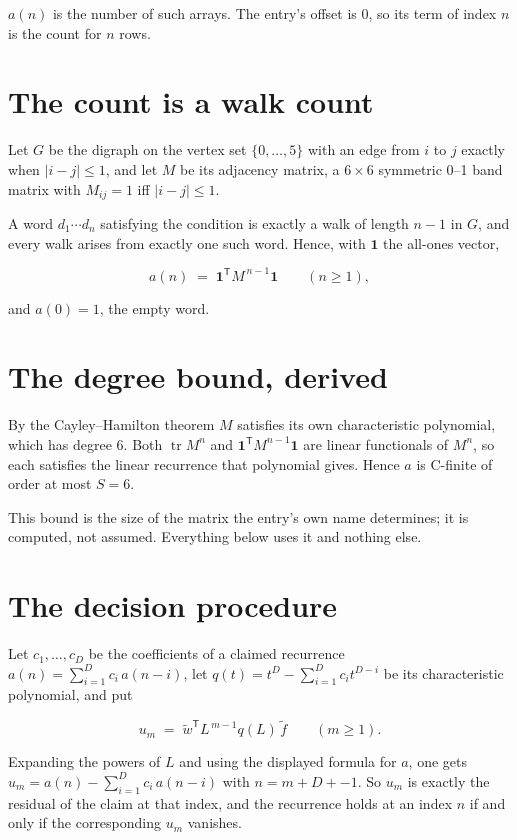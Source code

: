 \documentclass[11pt]{article}
\theoremstyle{definition}
\begin{document}
$a(n)$ is the number of such arrays. The entry's offset is 0, so its term of index $n$ is the count for $n$ rows.

\section{The count is a walk count}

Let $G$ be the digraph on the vertex set $\{0,\dots,5\}$ with an edge from $i$ to $j$ exactly when $|i-j| \le 1$, and let $M$ be its adjacency matrix, a $6 \times 6$ symmetric 0--1 band matrix with $M_{ij} = 1$ iff $|i-j| \le 1$.

A word $d_1\cdots d_n$ satisfying the condition is exactly a walk of length $n-1$ in $G$, and every walk arises from exactly one such word. Hence, with $\mathbf 1$ the all-ones vector,

\[a(n) \;=\; \mathbf 1^{\mathsf T} M^{\,n-1} \mathbf 1 \qquad (n \ge 1),\]

and $a(0) = 1$, the empty word.

\section{The degree bound, derived}

By the Cayley--Hamilton theorem $M$ satisfies its own characteristic polynomial, which has degree $6$. Both $\operatorname{tr} M^n$ and $\mathbf 1^{\mathsf T} M^{n-1} \mathbf 1$ are linear functionals of $M^{n}$, so each satisfies the linear recurrence that polynomial gives. Hence $a$ is C-finite of order at most $S = 6$.

This bound is the size of the matrix the entry's own name determines; it is computed, not assumed. Everything below uses it and nothing else.

\section{The decision procedure}

Let $c_1,\dots,c_D$ be the coefficients of a claimed recurrence $a(n) = \sum_{i=1}^{D} c_i\,a(n-i)$, let $q(t) = t^{D} - \sum_{i=1}^{D} c_i t^{D-i}$ be its characteristic polynomial, and put

\[u_m \;=\; \tilde w^{\mathsf T} L^{\,m-1} q(L)\,\tilde f \qquad (m \ge 1).\]

Expanding the powers of $L$ and using the displayed formula for $a$, one gets $u_m = a(n) - \sum_{i=1}^{D} c_i\,a(n-i)$ with $n = m + D + -1$. So $u_m$ is exactly the residual of the claim at that index, and the recurrence holds at an index $n$ if and only if the corresponding $u_m$ vanishes.
\end{document}
